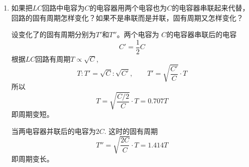 \begin{enumerate}
	\item 如果把$LC$回路中电容为$C$的电容器用两个电容也为$C$的电容器串联起来代替，回路的固有周期怎样变化？如果不是串联而是并联，固有周期又怎样变化？

    \begin{solution}
设变化了的固有周期分别为$T'$和$T''$。两个电容为
$C$的电容器串联后的电容
\[C'=\frac{1}{2}C\]
根据$LC$回路有周期$T\propto \sqrt{C}$,
\[T:T'=\sqrt{C}:\sqrt{C'},\qquad T'=\sqrt{\frac{C'}{C}}\cdot T\]
所以
\[T=\sqrt{\frac{C/2}{C}}\cdot T=0.707T\]
即周期变短。

当两电容器并联后的电容为$2C$. 这时的固有周期
\[T''=\sqrt{\frac{2C}{C}}\cdot T=1.414T\]
即周期变长。
    \end{solution}
    
\end{enumerate}



